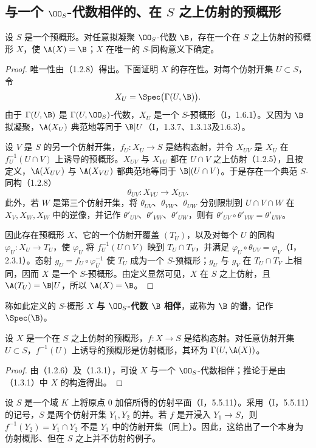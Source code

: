 \subsection{与一个 \texorpdfstring{$\OO_S$}{结构层}-代数相伴的、在 \texorpdfstring{$S$}{S} 之上仿射的预概形}
设 $S$ 是一个预概形。对任意拟凝聚 $\OO_S$-代数 $\B$，存在一个在 $S$ 之上仿射的预概形 $X$，使 $\A(X)=\B$；$X$ 在唯一的 $S$-同构意义下确定。
\begin{proof}
唯一性由（1.2.8）得出。下面证明 $X$ 的存在性。对每个仿射开集 $U\subset S$，令
\[
X_U=\Spec\bigl(\Gamma(U,\B)\bigr).
\]
由于 $\Gamma(U,\B)$ 是 $\Gamma(U,\OO_S)$-代数，$X_U$ 是一个 $S$-预概形（I，1.6.1）。又因为 $\B$ 拟凝聚，$\A(X_U)$ 典范地等同于 $\B|U$（I，1.3.7、1.3.13及1.6.3）。

设 $V$ 是 $S$ 的另一个仿射开集，$f_U:X_U\to S$ 是结构态射，并令 $X_{UV}$ 是 $X_U$ 在 $f_U^{-1}(U\cap V)$ 上诱导的预概形。$X_{UV}$ 与 $X_{VU}$ 都在 $U\cap V$ 之上仿射（1.2.5），且按定义，$\A(X_{UV})$ 与 $\A(X_{VU})$ 都典范地等同于 $\B|(U\cap V)$。于是存在一个典范 $S$-同构（1.2.8）
\[
\theta_{UV}:X_{VU}\longrightarrow X_{UV}.
\]
此外，若 $W$ 是第三个仿射开集，将 $\theta_{UV}$、$\theta_{VW}$、$\theta_{UW}$ 分别限制到 $U\cap V\cap W$ 在 $X_V,X_W,X_W$ 中的逆像，并记作 $\theta'_{UV}$、$\theta'_{VW}$、$\theta'_{UW}$，则有
$\theta'_{UV}\circ\theta'_{VW}=\theta'_{UW}$。

因此存在预概形 $X$、它的一个仿射开覆盖 $(T_U)$，以及对每个 $U$ 的同构 $\varphi_U:X_U\to T_U$，使 $\varphi_U$ 将 $f_U^{-1}(U\cap V)$ 映到 $T_U\cap T_V$，并满足
$\varphi_U\circ\theta_{UV}=\varphi_V$（I，2.3.1）。态射
$g_U=f_U\circ\varphi_U^{-1}$ 使 $T_U$ 成为一个 $S$-预概形；$g_U$ 与 $g_V$ 在 $T_U\cap T_V$ 上相同，因而 $X$ 是一个 $S$-预概形。由定义显然可见，$X$ 在 $S$ 之上仿射，且 $\A(T_U)=\B|U$，所以 $\A(X)=\B$。
\end{proof}
称如此定义的 $S$-概形 $X$ \textbf{与 $\OO_S$-代数 $\B$ 相伴}，或称为 $\B$ 的\textbf{谱}，记作 $\Spec(\B)$。

设 $X$ 是一个在 $S$ 之上仿射的预概形，$f:X\to S$ 是结构态射。对任意仿射开集 $U\subset S$，$f^{-1}(U)$ 上诱导的预概形是仿射概形，其环为 $\Gamma(U,\A(X))$。
\begin{proof}
由（1.2.6）及（1.3.1），可设 $X$ 与一个 $\OO_S$-代数相伴；推论于是由（1.3.1）中 $X$ 的构造得出。
\end{proof}

设 $S$ 是一个域 $K$ 上将原点 $0$ 加倍所得的仿射平面（I，5.5.11）。采用（I，5.5.11）的记号，$S$ 是两个仿射开集 $Y_1,Y_2$ 的并。若 $f$ 是开浸入 $Y_1\to S$，则
$f^{-1}(Y_2)=Y_1\cap Y_2$ 不是 $Y_1$ 中的仿射开集（同上）。因此，这给出了一个本身为仿射概形、但在 $S$ 之上并不仿射的例子。

